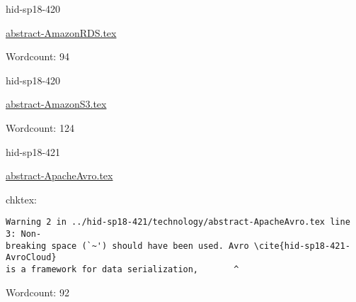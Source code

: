 

\begin{IU}

hid-sp18-420

\href{https://github.com/cloudmesh-community/hid-sp18-420/blob/master//technology/abstract-AmazonRDS.tex}{abstract-AmazonRDS.tex}

 

Wordcount: 94

\end{IU}



\begin{IU}

hid-sp18-420

\href{https://github.com/cloudmesh-community/hid-sp18-420/blob/master//technology/abstract-AmazonS3.tex}{abstract-AmazonS3.tex}

 

Wordcount: 124

\end{IU}



\begin{IU}

hid-sp18-421

\href{https://github.com/cloudmesh-community/hid-sp18-421/blob/master//technology/abstract-ApacheAvro.tex}{abstract-ApacheAvro.tex}

 
chktex:
\begin{tiny}
\begin{verbatim}
Warning 2 in ../hid-sp18-421/technology/abstract-ApacheAvro.tex line 3: Non-
breaking space (`~') should have been used. Avro \cite{hid-sp18-421-AvroCloud}
is a framework for data serialization,       ^
\end{verbatim}
\end{tiny}

Wordcount: 92

\end{IU}



